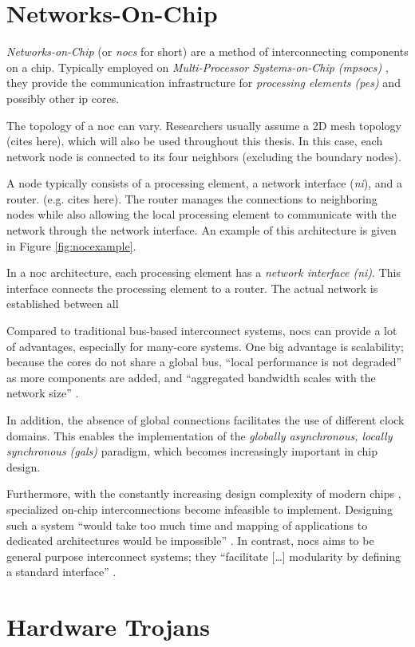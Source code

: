 \section{Networks-On-Chip}\label{sec:networkonchip}
\textit{Networks-on-Chip} (or \textit{\glspl{noc}} for short) are a method of interconnecting components on a chip. Typically employed on
\textit{Multi-Processor Systems-on-Chip (\glspl{mpsoc})} \cites(e.g.)(){ivanov05nocintroduction}{biswas15routerattack}{tatas16designingnocs}, they
provide the communication infrastructure for \textit{processing elements (\glspl{pe})} and possibly other \gls{ip} cores.

The topology of a \gls{noc} can vary. Researchers usually assume a 2D mesh topology (cites here), which will also be used throughout this thesis.
In this case, each network node is connected to its four neighbors (excluding the boundary nodes).

A node typically consists of a processing element, a network interface (\textit{\gls{ni}}), and a router. (e.g. cites here). The router manages the connections to
neighboring nodes while also allowing the local processing element to communicate with the network through the network interface. An example of this
architecture is given in Figure \vref{fig:nocexample}. %

In a \gls{noc} architecture, each processing element has a \textit{network interface (\gls{ni})}. This interface connects the processing element to a
router. The actual network is established between all

Compared to traditional bus-based interconnect systems, \glspl{noc} can provide a lot of advantages, especially for many-core systems.
\cite[5\psqq]{tatas16designingnocs} One big advantage is scalability; because the cores do not share a global bus, \enquote{local performance is not
degraded} \cite[6]{tatas16designingnocs} as more components are added, and \enquote{aggregated bandwidth scales with the network size}
\cite[6]{tatas16designingnocs}.

In addition, the absence of global connections facilitates the use of different clock domains. This enables the implementation of the
\textit{globally asynchronous, locally synchronous (\gls{gals})} paradigm, which becomes increasingly important in chip design.
\cites[3]{kumar02networkonchip}[2]{ivanov05nocintroduction}

Furthermore, with the constantly increasing design complexity of modern chips \cite{mack11mooreslaw}, specialized on-chip
interconnections become infeasible to implement. Designing such a system \enquote{would take too much time and mapping of applications to dedicated
architectures would be impossible} \cite[1]{kumar02networkonchip}. In contrast, \glspl{noc} aims to be general purpose interconnect systems; they
\enquote{facilitate […] modularity by defining a standard interface} \cite[1]{dally01routepacketsnotwires}.

\section{Hardware Trojans}\label{sec:hardwaretrojans}

